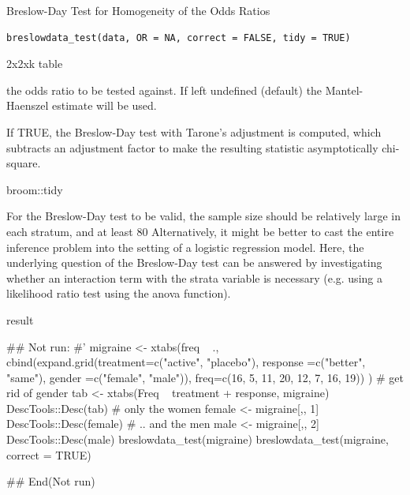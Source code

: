 \documentclass[a4paper]{book}
\begin{document}
%
\begin{Description}
Breslow-Day Test for Homogeneity of the Odds Ratios
\end{Description}
%
\begin{Usage}
\begin{verbatim}
breslowdata_test(data, OR = NA, correct = FALSE, tidy = TRUE)
\end{verbatim}
\end{Usage}
%
\begin{Arguments}
\begin{ldescription}
\item[\code{data}] 2x2xk table

\item[\code{OR}] the odds ratio to be tested against. If left undefined (default) the Mantel-Haenszel estimate will be used.

\item[\code{correct}] If TRUE, the Breslow-Day test with Tarone's adjustment is computed, which subtracts an adjustment factor to make the resulting statistic asymptotically chi-square.

\item[\code{tidy}] broom::tidy
\end{ldescription}
\end{Arguments}
%
\begin{Details}
For the Breslow-Day test to be valid, the sample size should be relatively large in each stratum, and at least 80
Alternatively, it might be better to cast the entire inference problem into the setting of a logistic regression model. Here, the underlying question of the Breslow-Day test can be answered by investigating whether an interaction term with the strata variable is necessary (e.g. using a likelihood ratio test using the anova function).
\end{Details}
%
\begin{Value}
result
\end{Value}
%
\begin{Examples}
\begin{ExampleCode}
## Not run: 
#'
migraine <- xtabs(freq ~ .,
                  cbind(expand.grid(treatment=c("active", "placebo"),
                                    response =c("better", "same"),
                                    gender   =c("female", "male")),
                        freq=c(16, 5, 11, 20, 12, 7, 16, 19))
)
# get rid of gender
tab <- xtabs(Freq ~ treatment + response, migraine)
DescTools::Desc(tab)
# only the women
female <- migraine[,, 1]
DescTools::Desc(female)
# .. and the men
male <- migraine[,, 2]
DescTools::Desc(male)
breslowdata_test(migraine)
breslowdata_test(migraine, correct = TRUE)


## End(Not run)
\end{ExampleCode}
\end{Examples}
\end{document}
